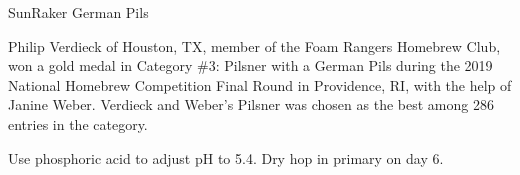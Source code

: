 \begin{recipe}{SunRaker German Pils}

\begin{aboutblock}
Philip Verdieck of Houston, TX, member of the Foam Rangers Homebrew Club, won a
gold medal in Category \#3: Pilsner with a German Pils during the 2019 National
Homebrew Competition Final Round in Providence, RI, with the help of Janine Weber.
Verdieck and Weber's Pilsner was chosen as the best among 286 entries in the
category. \sourceaha
\end{aboutblock}


\begin{methodandtiming}
 
\begin{mashsteps}
\end{mashsteps}

\begin{fermentationsteps}
\end{fermentationsteps}

\begin{directions}
Use phosphoric acid to adjust pH to 5.4. Dry hop in primary on day 6. 
\end{directions}

\end{methodandtiming}

\recipebreak

\begin{ingredientsblock}

\begin{malts}
\end{malts}

\begin{hops}
\end{hops}


\end{ingredientsblock}

\end{recipe}
